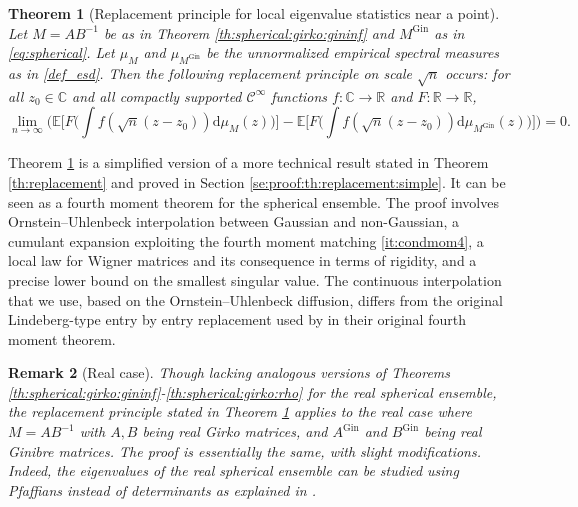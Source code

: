 \documentclass[10pt,reqno]{amsart}
\newcommand{\dd}{\mathrm{d}}
\newcommand{\<}{\langle}
\renewcommand{\>}{\rangle}
\newcommand{\MG}{M^{\mathrm{Gin}}}
\numberwithin{equation}{section}
\newtheorem{theorem}{Theorem}[section]%
\newtheorem{remark}[theorem]{Remark}%
\begin{document}
\begin{theorem}[Replacement principle for local eigenvalue statistics near a point]\label{th:replacement:simple}  
Let $M=AB^{-1}$ be as in Theorem \ref{th:spherical:girko:gininf} and $\MG$ as in \eqref{eq:spherical}. Let $\mu_M$ and $\mu_{\MG}$ be the unnormalized empirical spectral measures as in \eqref{def_esd}. %
Then the following replacement principle on scale $\sqrt{n}$ occurs: for all $z_0 \in \mathbb C$ and all compactly supported $\mathcal{C}^\infty$ functions $f:\mathbb{C}\to\mathbb{R}$ and $F:\mathbb{R}\to\mathbb{R}$, 
    \[
    \lim_{n \rightarrow \infty}\Bigr(\mathbb{E}\Bigr[F\Bigr(  \int f(\sqrt n (z-z_0))\dd\mu_M(z)\Bigr)\Bigr]
    -\mathbb{E}\Bigr[F\Bigr( \int f(\sqrt n (z-z_0))\dd\mu_{\MG}(z)\Bigr)\Bigr]\Bigr) =0.
    \]
\end{theorem}

Theorem \ref{th:replacement:simple} is a simplified version of a more technical result stated in Theorem \ref{th:replacement} and proved in Section \ref{se:proof:th:replacement:simple}. It can be seen as a fourth moment theorem for the spherical ensemble. 
The proof involves Ornstein--Uhlenbeck interpolation between Gaussian and non-Gaussian, a cumulant expansion exploiting the fourth moment matching \ref{it:condmom4}, a local law for Wigner matrices and its consequence in terms of rigidity, and a precise lower bound on the smallest singular value.
The continuous interpolation that we use, based on the Ornstein--Uhlenbeck diffusion, differs from the original Lindeberg-type entry by entry replacement used by \cite{MR3306005} in their original fourth moment theorem. 


\begin{remark}[Real case]\label{rem:real}
 Though lacking analogous versions of Theorems \ref{th:spherical:girko:gininf}-\ref{th:spherical:girko:rho} for the real spherical ensemble, the replacement principle stated in Theorem \ref{th:replacement:simple} applies to the 
real case where $M=AB^{-1}$ with $A,B$ being real Girko matrices, and $A^{\mathrm{Gin}}$ and
$B^{\mathrm{Gin}}$ being real Ginibre matrices. The proof is essentially the same, with slight modifications.
  Indeed, the eigenvalues of the real spherical ensemble can be studied using Pfaffians instead
 of determinants as explained in
 \cite{zbMATH06125015}.

 
\end{remark}
\end{document}
